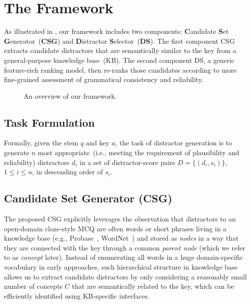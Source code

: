 \section{The Framework}
\label{sec:method}
As illustrated in , our framework includes two 
components: \textbf{C}andidate \textbf{S}et \textbf{G}enerator~(\textbf{CSG}) and \textbf{D}istractor \textbf{S}elector~(\textbf{DS}). The first component CSG extracts candidate distractors that are semantically similar to the key from a general-purpose knowledge base~(KB). The second component DS, a generic feature-rich ranking model, then re-ranks those candidates according to more fine-grained assessment of grammatical consistency and reliability.
\begin{figure}[th]
\centering
{}
\caption{An overview of our framework.} \label{fig:framework}
\end{figure}

\subsection{Task Formulation}
Formally, given the stem $q$ and key $a$, the task of distractor generation is to generate $n$ most 
appropriate~(i.e., meeting the requirement of plausibility and reliability) distractors $d_i$ in a set of distractor-score pairs $D = \{(d_i, s_i)\}$, $1\leq i\leq n$,
in descending order of $s_i$.

\subsection{Candidate Set Generator (CSG)}
\label{sec:CSG}
The proposed CSG explicitly leverages the observation that distractors to 
an open-domain cloze-style MCQ are often words or short phrases 
living in a knowledge base (e.g., Probase~\cite{wu2012probase}, WordNet~\cite{leacock1998combining}) and stored as \textit{nodes} in a way that they are connected with the key through a common \textit{parent node} (which we refer to as \textit{concept} later). Instead of enumerating all words in a huge 
domain-specific vocabulary in early approaches, such hierarchical structure in knowledge base allows us to extract candidate distractors by only considering a reasonably small number of concepts $C$ that are semantically related to the key, 
which can be efficiently identified using KB-specific interfaces.


